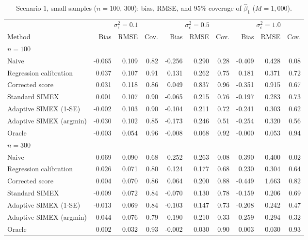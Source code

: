 \begin{table}[t]
\centering
\footnotesize
\caption{Scenario 1, small samples ($n=100$, $300$): bias, RMSE,
and 95\% coverage of $\hat\beta_1$ ($M=1{,}000$).}
\label{tab:scenario1-small}
\begin{tabular}{l rrr rrr rrr}
\toprule
& \multicolumn{3}{c}{$\sigma^2_\epsilon = 0.1$} & \multicolumn{3}{c}{$\sigma^2_\epsilon = 0.5$} & \multicolumn{3}{c}{$\sigma^2_\epsilon = 1.0$} \\
\cmidrule(lr){2-4}\cmidrule(lr){5-7}\cmidrule(lr){8-10}
Method & Bias & RMSE & Cov. & Bias & RMSE & Cov. & Bias & RMSE & Cov. \\
\midrule
\multicolumn{10}{l}{\emph{$n = 100$}} \\
Naive & -0.065 & 0.109 & 0.82 & -0.256 & 0.290 & 0.28 & -0.409 & 0.428 & 0.08 \\
Regression calibration & 0.037 & 0.107 & 0.91 & 0.131 & 0.262 & 0.75 & 0.181 & 0.371 & 0.72 \\
Corrected score & 0.031 & 0.118 & 0.86 & 0.049 & 0.837 & 0.96 & -0.351 & 0.915 & 0.67 \\
Standard SIMEX & 0.001 & 0.107 & 0.90 & -0.065 & 0.215 & 0.76 & -0.197 & 0.283 & 0.73 \\
Adaptive SIMEX (1-SE) & -0.002 & 0.103 & 0.90 & -0.104 & 0.211 & 0.72 & -0.241 & 0.303 & 0.62 \\
Adaptive SIMEX (argmin) & -0.030 & 0.102 & 0.85 & -0.173 & 0.246 & 0.51 & -0.254 & 0.320 & 0.56 \\
Oracle & -0.003 & 0.054 & 0.96 & -0.008 & 0.068 & 0.92 & -0.000 & 0.053 & 0.94 \\
\midrule
\multicolumn{10}{l}{\emph{$n = 300$}} \\
Naive & -0.069 & 0.090 & 0.68 & -0.252 & 0.263 & 0.08 & -0.390 & 0.400 & 0.02 \\
Regression calibration & 0.026 & 0.071 & 0.80 & 0.124 & 0.177 & 0.68 & 0.230 & 0.304 & 0.64 \\
Corrected score & 0.004 & 0.070 & 0.86 & 0.064 & 0.200 & 0.88 & -0.449 & 1.663 & 0.82 \\
Standard SIMEX & -0.009 & 0.072 & 0.84 & -0.070 & 0.130 & 0.78 & -0.159 & 0.206 & 0.69 \\
Adaptive SIMEX (1-SE) & -0.013 & 0.069 & 0.84 & -0.103 & 0.147 & 0.73 & -0.208 & 0.242 & 0.47 \\
Adaptive SIMEX (argmin) & -0.044 & 0.076 & 0.79 & -0.190 & 0.210 & 0.33 & -0.259 & 0.294 & 0.32 \\
Oracle & 0.002 & 0.032 & 0.93 & -0.002 & 0.030 & 0.90 & 0.003 & 0.030 & 0.93 \\
\bottomrule
\end{tabular}
\end{table}